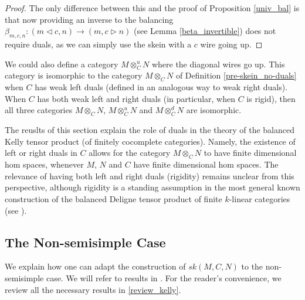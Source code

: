 \begin{proof}
  The only difference between this and the proof of Proposition \ref{univ_bal}
  is that now providing an inverse to the balancing $\beta_{m,c,n}:(m\lhd c,
  n)\to (m,c\rhd n)$ (see Lemma \ref{beta_invertible}) does not require duals,
  as we can simply use the skein with a $c$ wire going up.
\end{proof}
  
\begin{remark}
  We could also define a category $M\otimes_C^u N$ where the diagonal wires go
  up. This category is isomorphic to the category $M\otimes_C N$ of Definition
  \ref{pre-skein_no-duals} when $C$ has weak left duals (defined in an
  analogous way to weak right duals). When $C$ has both weak left and right
  duals (in particular, when $C$ is rigid), then all three categories
  $M\otimes_C N$, $M\otimes^u_C N$ and $M\otimes_C^d N$ are isomorphic.
\end{remark}

\begin{remark}
The reuslts of this section explain the role of duals in the theory
of the balanced Kelly tensor product (of finitely cocomplete categories).
Namely, the existence of left or right duals in $C$ allows for the category 
$M\otimes_C N$ to have finite dimensional hom spaces, whenever $M$, $N$ and 
$C$ have finite dimensional hom spaces. The relevance of having both left and 
right duals (rigidity) remains unclear from this perspective, although rigidity 
is a standing assumption in the most general known
construction of the balanced Deligne tensor product of finite $k$-linear categories 
(see \cite{douglas/balanced-product}).\end{remark}

\subsection{The Non-semisimple Case} \label{section-nonsemisimple}

We explain how one can adapt the construction of $sk(M,C,N)$ to the
non-semisimple case. We will refer to results in
\cite{kelly/basic-concepts-enriched}. For the reader's convenience, we review
all the necessary results in \ref{review_kelly}.

